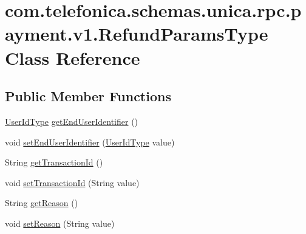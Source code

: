 \hypertarget{classcom_1_1telefonica_1_1schemas_1_1unica_1_1rpc_1_1payment_1_1v1_1_1RefundParamsType}{
\section{com.telefonica.schemas.unica.rpc.payment.v1.RefundParamsType Class Reference}
\label{classcom_1_1telefonica_1_1schemas_1_1unica_1_1rpc_1_1payment_1_1v1_1_1RefundParamsType}
}
\subsection*{Public Member Functions}
\begin{DoxyCompactItemize}
\item 
\hyperlink{classcom_1_1telefonica_1_1schemas_1_1unica_1_1rpc_1_1common_1_1v1_1_1UserIdType}{UserIdType} \hyperlink{classcom_1_1telefonica_1_1schemas_1_1unica_1_1rpc_1_1payment_1_1v1_1_1RefundParamsType_aeda55dbf68874554a3ee39de9d0dfad2}{getEndUserIdentifier} ()
\item 
void \hyperlink{classcom_1_1telefonica_1_1schemas_1_1unica_1_1rpc_1_1payment_1_1v1_1_1RefundParamsType_a5317a70f8dc4a6b39960b2d2063d0dab}{setEndUserIdentifier} (\hyperlink{classcom_1_1telefonica_1_1schemas_1_1unica_1_1rpc_1_1common_1_1v1_1_1UserIdType}{UserIdType} value)
\item 
String \hyperlink{classcom_1_1telefonica_1_1schemas_1_1unica_1_1rpc_1_1payment_1_1v1_1_1RefundParamsType_ad0cdb84f57737326189a09c00a8d7367}{getTransactionId} ()
\item 
void \hyperlink{classcom_1_1telefonica_1_1schemas_1_1unica_1_1rpc_1_1payment_1_1v1_1_1RefundParamsType_ac6c072a02ddeaf5315ad4669ae19fd90}{setTransactionId} (String value)
\item 
String \hyperlink{classcom_1_1telefonica_1_1schemas_1_1unica_1_1rpc_1_1payment_1_1v1_1_1RefundParamsType_ad1729fd53e01b67d126bd5a8b8461885}{getReason} ()
\item 
void \hyperlink{classcom_1_1telefonica_1_1schemas_1_1unica_1_1rpc_1_1payment_1_1v1_1_1RefundParamsType_ae7f404fd59479a77f8a4e804306996f6}{setReason} (String value)
\end{DoxyCompactItemize}
